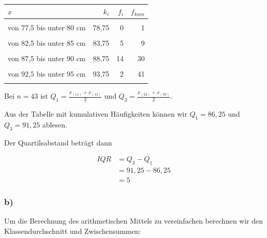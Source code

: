 \documentclass[
  11pt,
  ngerman,
  a4paper,
]{report}
\begin{document}
\begin{table}[H]
\centering
\begin{tabular}{>{\raggedright\arraybackslash}p{8cm}rrr}
\toprule
\textbf{$x$} & \textbf{$k_i$} & \textbf{$f_i$} & \textbf{$f_{kum}$}\\
\midrule
\cellcolor{gray!6}{von 75 bis unter 77,5 cm} & \cellcolor{gray!6}{76,25} & \cellcolor{gray!6}{1} & \cellcolor{gray!6}{1}\\
von 77,5 bis unter 80 cm & 78,75 & 0 & 1\\
\cellcolor{gray!6}{von 80 bis unter 82,5 cm} & \cellcolor{gray!6}{81,25} & \cellcolor{gray!6}{3} & \cellcolor{gray!6}{4}\\
von 82,5 bis unter 85 cm & 83,75 & 5 & 9\\
\cellcolor{gray!6}{von 85 bis unter 87,5 cm} & \cellcolor{gray!6}{86,25} & \cellcolor{gray!6}{7} & \cellcolor{gray!6}{16}\\
von 87,5 bis unter 90 cm & 88,75 & 14 & 30\\
\cellcolor{gray!6}{von 90 bis unter 92,5 cm} & \cellcolor{gray!6}{91,25} & \cellcolor{gray!6}{9} & \cellcolor{gray!6}{39}\\
von 92,5 bis unter 95 cm & 93,75 & 2 & 41\\
\cellcolor{gray!6}{von 95 bis unter 97,5 cm} & \cellcolor{gray!6}{96,25} & \cellcolor{gray!6}{2} & \cellcolor{gray!6}{43}\\
\bottomrule
\end{tabular}
\end{table}

Bei \(n=43\) ist \(Q_1=\frac{x_{(11)}+x_{(12)}}{2}\) und \(Q_3=\frac{x_{(32)}+x_{(33)}}{2}\).

Aus der Tabelle mit kumulativen Häufigkeiten können wir \(Q_1=86{,}25\) und \(Q_3=91{,}25\) ablesen.

Der Quartilsabstand beträgt dann

\[\begin{aligned}
\mathit{IQR}&=Q_3-Q_1\\
            &=91{,}25-86{,}25\\
            &=5
\end{aligned}\]

\hypertarget{b-5}{%
\subsubsection{b)}\label{b-5}}

Um die Berechnung des arithmetischen Mittels zu vereinfachen berechnen wir den Klassendurchschnitt und Zwischensummen:
\end{document}
